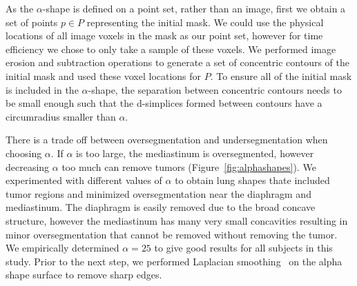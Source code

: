 \documentclass{llncs}
\begin{document}
As the $\alpha$-shape is defined on a point set, rather than an image, first we obtain a set of points $p \in P$ representing the initial mask. We could use the physical locations of all image voxels in the mask as our point set, however for time efficiency we chose to only take a sample of these voxels. We performed image erosion and subtraction operations to generate a set of concentric contours of the initial mask and used these voxel locations for $P$. To ensure all of the initial mask is included in the $\alpha$-shape, the separation between concentric contours needs to be small enough such that the d-simplices formed between contours have a circumradius smaller than $\alpha$. 


There is a trade off between oversegmentation and undersegmentation when choosing $\alpha$. If $\alpha$ is too large, the mediastinum is oversegmented, however decreasing $\alpha$ too much can remove tumors (Figure~\ref{fig:alphashapes}).  We experimented with different values of $\alpha$ to obtain lung shapes thate included tumor regions and minimized oversegmentation near the diaphragm and mediastinum. The diaphragm is easily removed due to the broad concave structure, however the mediastinum has many very small concavities resulting in minor oversegmentation that cannot be removed without removing the tumor. We empirically determined $ \alpha=25 $ to give good results for all subjects in this study. Prior to the next step, we performed Laplacian smoothing~\cite{herrmann1976} on the alpha shape surface to remove sharp edges. 
\end{document}
